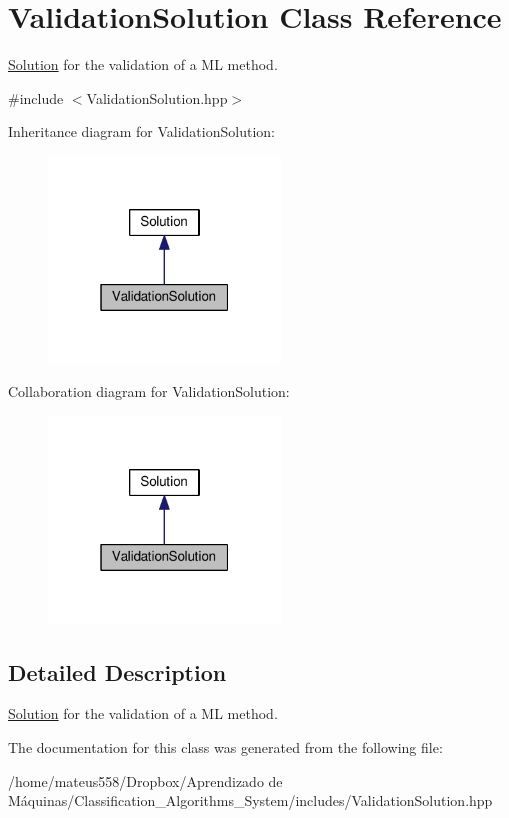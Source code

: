 \hypertarget{class_validation_solution}{}\section{Validation\+Solution Class Reference}
\label{class_validation_solution}


\hyperlink{class_solution}{Solution} for the validation of a ML method.  




{\ttfamily \#include $<$Validation\+Solution.\+hpp$>$}



Inheritance diagram for Validation\+Solution\+:\nopagebreak
\begin{figure}[H]
\begin{center}
\leavevmode
\includegraphics[width=175pt]{class_validation_solution__inherit__graph}
\end{center}
\end{figure}


Collaboration diagram for Validation\+Solution\+:\nopagebreak
\begin{figure}[H]
\begin{center}
\leavevmode
\includegraphics[width=175pt]{class_validation_solution__coll__graph}
\end{center}
\end{figure}


\subsection{Detailed Description}
\hyperlink{class_solution}{Solution} for the validation of a ML method. 

The documentation for this class was generated from the following file\+:\begin{DoxyCompactItemize}
\item 
/home/mateus558/\+Dropbox/\+Aprendizado de Máquinas/\+Classification\+\_\+\+Algorithms\+\_\+\+System/includes/Validation\+Solution.\+hpp\end{DoxyCompactItemize}
